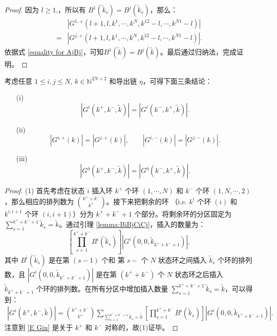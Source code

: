 \begin{appendices}
\begin{proof}
	因为 $l\ge 1$,，所以有 $B^1(\tilde{k}_s)=B^j(\tilde{k}_s)$，那么：
	\begin{align*}
		&\left|G^{1,+}\left(l+1,l,k^1,\cdots,k^N,k^{12}-l,\cdots,k^{N1}-l\right)\right|\\
		=&\left|G^{j,+}\left(l+1,l,k^1,\cdots,k^N,k^{12}-l,\cdots,k^{N1}-l\right)\right|.
	\end{align*}
	依据式 \eqref{equality for AjBj}，可知$B^1(\tilde{k})=B^j(\tilde{k})$。最后通过归纳法，完成证明。
\end{proof}
\begin{proposition}\label{proposition:E Gin}
	考虑任意 $1\le i,j\le N$, $k\in\mathbb{N}^{2N+2}$ 和导出链 $\eta$，可得下面三条结论：
	\begin{itemize}
		\item[(i)] 
		\begin{equation}\label{EGin}
			\left|G^i\left(k^+,k^-,\tilde{k}\right)\right|=\left|G^i\left(k^-,k^+,\tilde{k}\right)\right|.
		\end{equation}
		\item[(ii)] 
		\begin{equation}\label{E Gi1cdotsNn}
			\left|G^{i,+}(k)\right|=\left|G^{j,+}(k)\right|,\qquad\left|G^{i,-}(k)\right|=\left|G^{j,-}(k)\right|.
		\end{equation}
		\item[(iii)]  
		\begin{equation}\label{EGetan}
			\left|G^{\eta}\left(k^+,k^-,\tilde{k}\right)\right|=\left|G^{\eta}\left(k^-,k^+,\tilde{k}\right)\right|.
		\end{equation}
	\end{itemize}
\end{proposition}
\begin{proof}
	(1) 首先考虑在状态 $i$ 插入环 $k^+$ 个环 $(1,\cdots,N)$ 和 $k^-$ 个环  $(1,N,\cdots,2)$，那么相应的排列数为 $\binom{k^++k^-}{k^+}$。接下来把剩余的环 （i.e. $k^i$ 个环 $(i)$ 和 $k^{i,i+1}$ 个环 $(i,i+1)$）分为 $k^++k^-+1$ 个部分。将剩余环的分区固定为 $\sum_{s=1}^{k^++k^-+1}\tilde{k}_s=\tilde{k}$。通过引理 \ref{lemma:BiBjCiCj}，插入的数量为：
	\begin{equation*}
		\left[\prod_{s=1}^{k^++k^-}B^i(\tilde{k}_s)\right]\left|G^i(0,0,\tilde{k}_{k^++k^-+1})\right|,
	\end{equation*}
	其中 $B^i(\tilde{k}_s)$ 是在第 $(s-1)$ 个和 第 $s-$ 个 $N$ 状态环之间插入 $\tilde{k}_s$ 个环的排列数，且 $|G^i(0,0,\tilde{k}_{k^++k^-+1})|$ 是在第 $(k^++k^-)$ 个 $N$ 状态环之后插入 $\tilde{k}_{k^++k^-+1}$ 个环的排列数。在所有分区中增加插入数量 $\sum_{s=1}^{k^++k^-+1}\tilde{k}_s=\tilde{k}$，可以得到：
	\begin{align}\label{E Gin}
		\left|G^i\left(k^+,k^-,\tilde{k}\right)\right|=\binom{k^++k^-}{k^+}\sum_{\sum_{s=1}^{k^++k^-+1}\tilde{k}_s=\tilde{k}}\left[\prod_{s=1}^{k^++k^-}B^i\left(\tilde{k}_s\right)\right]\left|G^i\left(0,0,\tilde{k}_{k^++k^-+1}\right)\right|.
	\end{align}
	注意到 \eqref{E Gin} 是关于 $k^+$ 和 $k^-$ 对称的，故(1)证毕。
	

\end{proof}
\end{appendices}
